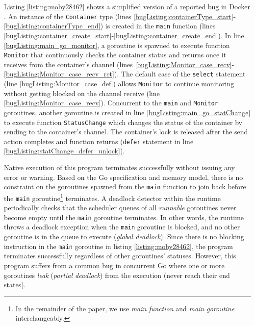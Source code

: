 %

%


Listing \ref{listing:moby28462} shows a simplified version of a reported bug in Docker \cite{moby-28462-commit}.
%
An instance of the \texttt{Container} type (lines \ref{bugListing:containerType_start}-\ref{bugListing:containerType_end}) is created in the \texttt{main} function (lines \ref{bugListing:container_create_start}-\ref{bugListing:container_create_end}).
%
In line \ref{bugListing:main_go_monitor}, a goroutine is spawned to execute function \texttt{Monitor} that continuously checks the container status and returns once it receives from the container's channel (lines \ref{bugListing:Monitor_case_recv}-\ref{bugListing:Monitor_case_recv_ret}).
%
The default case of the \texttt{select} statement (line \ref{bugListing:Monitor_case_def}) allows \texttt{Monitor} to continue monitoring without getting blocked on the channel receive (line \ref{bugListing:Monitor_case_recv}).
%
Concurrent to the \texttt{main} and \texttt{Monitor} goroutines, another goroutine is created in line  \ref{bugListing:main_go_statChange} to execute function \texttt{StatusChange} which changes the status of the container by sending to the container's channel.
%
The container's lock is released after the send action completes and function returns (\texttt{defer} statement in line \ref{bugListing:statChange_defer_unlock}).
%


Native execution of this program terminates successfully without issuing any error or warning.
%
Based on the Go specification and memory model, there is no constraint on the goroutines spawned from the \texttt{main} function to join back before the \texttt{main} goroutine\footnote{In the remainder of the paper, we use \textit{main function} and \textit{main goroutine} interchangeably.} terminates.
%
A deadlock detector within the runtime periodically checks that the scheduler queues of all \textit{runnable} goroutines never become empty until the \texttt{main} goroutine terminates.
%
In other words, the runtime throws a deadlock exception when the \texttt{main} goroutine is blocked, and no other goroutine is in the queue to execute (\ie \textit{global deadlock}).
%
Since there is no blocking instruction in the \texttt{main} goroutine in listing \ref{listing:moby28462}, the program terminates successfully regardless of other goroutines' statuses.
%
However, this program suffers from a common bug in concurrent Go where one or more goroutines \textit{leak} (\ie \textit{partial deadlock}) from the execution (\ie never reach their end states).

